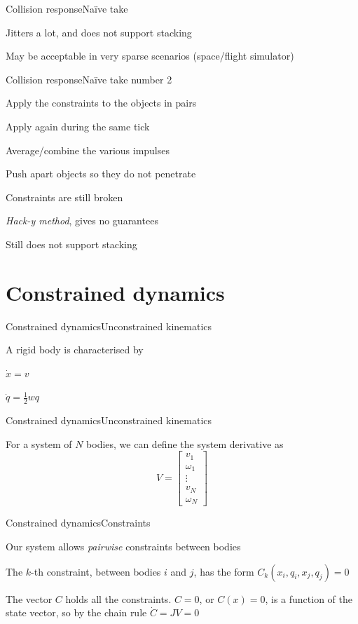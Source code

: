 \documentclass{beamer}
\begin{document}
\begin{slide}{Collision response}{Naïve take}{
\item Jitters a lot, and does not support stacking
\item May be acceptable in very sparse scenarios (space/flight simulator)
}\end{slide}

\begin{slide}{Collision response}{Naïve take number 2}{
\item Apply the constraints to the objects in pairs
\item Apply again during the same tick
\item Average/combine the various impulses
\item Push apart objects so they do not penetrate
\pause
\item Constraints are still broken
\item \textit{Hack-y method}, gives no guarantees
\item Still does not support stacking
}\end{slide}

\section{Constrained dynamics}
\begin{slide}{Constrained dynamics}{Unconstrained kinematics}{
\item A rigid body is characterised by
\item $\dot x = v$
\item $\dot q = \frac{1}{2}wq$
}\end{slide}

\begin{slide}{Constrained dynamics}{Unconstrained kinematics}{
\item For a system of $N$ bodies, we can define the system derivative as
$$V = \left[ \begin{matrix}
v_1 \\ \omega_1 \\ \vdots \\ v_N \\ \omega_N
\end{matrix} \right]$$
}\end{slide}

\begin{slide}{Constrained dynamics}{Constraints}{
\item Our system allows \textit{pairwise} constraints between bodies
\item The $k$-th constraint, between bodies $i$ and $j$, has the form $C_k(x_i,q_i,x_j,q_j) = 0$
\item The vector $C$ holds all the constraints. $C = 0$, or $C(x) = 0$, is a function of the state vector, so by the chain rule $\dot C = J V = 0$
}\end{slide}
\end{document}
